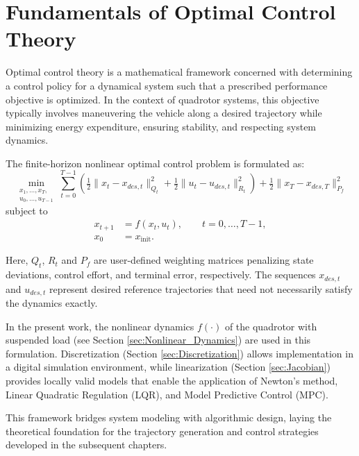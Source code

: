 \documentclass[a4paper,11pt,oneside]{book}
\begin{document}
\section{Fundamentals of Optimal Control Theory}

Optimal control theory is a mathematical framework concerned with determining a control policy for a dynamical system such that a prescribed performance objective is optimized. In the context of quadrotor systems, this objective typically involves maneuvering the vehicle along a desired trajectory while minimizing energy expenditure, ensuring stability, and respecting system dynamics.  

The finite-horizon nonlinear optimal control problem is formulated as:
\begin{equation}
\min_{
    \begin{matrix}
        x_1,\dots,x_T, \\ u_0,\dots,u_{T-1}
    \end{matrix}}
\sum_{t=0}^{T-1} 
\left( \tfrac{1}{2} \|x_t - x_{des,t}\|_{Q_t}^2 + \tfrac{1}{2} \|u_t - u_{des,t}\|_{R_t}^2 \right)
+ \tfrac{1}{2} \|x_T - x_{des,T}\|_{P_f}^2
\end{equation}
subject to
\begin{align}
    x_{t+1} &= f(x_t, u_t), \qquad t = 0,\dots,T-1, \\
    x_0 &= x_{\text{init}}.    
\end{align}

Here, $Q_t$, $R_t$ and $P_f$ are user-defined weighting matrices penalizing state deviations, control effort, and terminal error, respectively.
The sequences $x_{des,t}$ and $u_{des,t}$ represent desired reference trajectories that need not necessarily satisfy the dynamics exactly.

In the present work, the nonlinear dynamics $f(\cdot)$ of the quadrotor with suspended load (see Section \ref{sec:Nonlinear_Dynamics}) are used in this formulation. Discretization (Section \ref{sec:Discretization}) allows implementation in a digital simulation environment, while linearization (Section \ref{sec:Jacobian}) provides locally valid models that enable the application of Newton’s method, Linear Quadratic Regulation (LQR), and Model Predictive Control (MPC).

This framework bridges system modeling with algorithmic design, laying the theoretical foundation for the trajectory generation and control strategies developed in the subsequent chapters.
\end{document}
